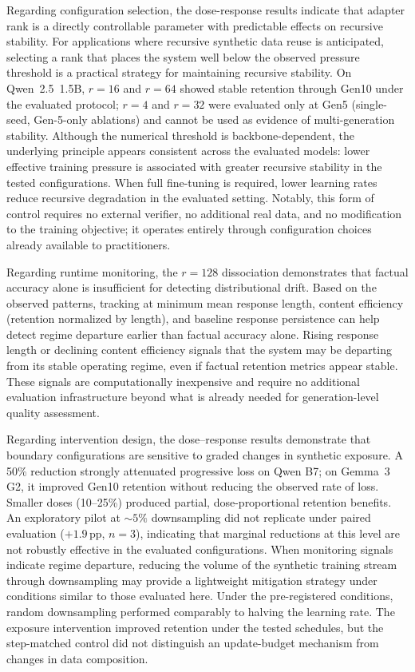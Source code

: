 \documentclass[a4paper,fleqn]{cas-dc}
\newif\ifshowchanges
\newcommand{\rev}[1]{\ifshowchanges{\color{blue}#1}\else{#1}\fi}
\begin{document}
Regarding configuration selection, the dose-response results indicate that
adapter rank is a directly controllable parameter with predictable effects on
recursive stability. For applications where recursive synthetic data reuse is
anticipated, selecting a rank that places the system well below the observed
pressure threshold is a practical strategy for maintaining recursive stability.
On Qwen~2.5~1.5B, $r=16$ and $r=64$ showed stable retention through Gen10 under the evaluated protocol; $r=4$ and $r=32$ were \rev{evaluated only at Gen5 (single-seed, Gen-5-only ablations)} and cannot be used as evidence of multi-generation stability. Although
the numerical threshold is backbone-dependent, the underlying principle appears
consistent across the evaluated models: lower effective training pressure is
associated with greater recursive stability in the tested configurations. When
full fine-tuning is required, lower learning rates reduce recursive degradation
in the evaluated setting. Notably, this form of control requires no external
verifier, no additional real data, and no modification to the training objective;
it operates entirely through configuration choices already available to
practitioners.

Regarding runtime monitoring, the $r=128$ dissociation demonstrates that factual
accuracy alone is insufficient for detecting distributional drift. Based on the
observed patterns, tracking at minimum mean response length, content efficiency
(retention normalized by length), and baseline response persistence can help
detect regime departure earlier than factual accuracy alone. Rising response
length or declining content efficiency signals that the system may be departing
from its stable operating regime, even if factual retention metrics appear
stable. These signals are computationally inexpensive and require no additional
evaluation infrastructure beyond what is already needed for generation-level
quality assessment.

Regarding intervention design, the \rev{dose--response results demonstrate that boundary}
configurations are sensitive to graded changes in synthetic exposure. \rev{A 50\%
reduction strongly attenuated progressive loss on Qwen B7; on Gemma~3 G2,
it improved Gen10 retention without reducing the observed rate of loss.
Smaller doses (10--25\%) produced partial, dose-proportional retention benefits. An exploratory pilot at
${\sim}5\%$ downsampling did not replicate under paired evaluation ($+1.9$\,pp,
$n=3$), indicating that marginal reductions at this level are not robustly
effective in the evaluated configurations.} When
monitoring signals indicate regime departure, reducing the volume of the
synthetic training stream through downsampling
may provide a lightweight mitigation strategy under conditions
similar to those evaluated here. \rev{Under the pre-registered conditions, random downsampling performed
comparably to halving the learning rate. The exposure intervention improved
retention under the tested schedules, but the step-matched control did not
distinguish an update-budget mechanism from changes in data composition.}
\end{document}
